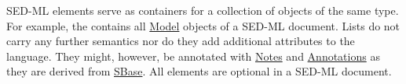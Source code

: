 \label{listOfElements}
SED-ML  elements serve as containers  for a collection of objects of the same type. For example, the  contains all \hyperref[class:model]{Model} objects of a SED-ML document. Lists do not carry any further semantics nor do they add additional attributes to the language. They might, however, be annotated with \hyperref[class:notes]{Notes} and \hyperref[class:annotation]{Annotations} as they are derived from \hyperref[class:sbase]{SBase}.
All  elements are optional in a SED-ML document. 

